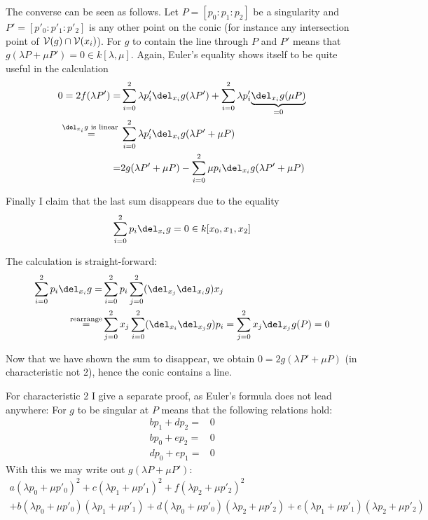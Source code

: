 The converse can be seen as follows. Let $P=[p_0:p_1:p_2]$ be a singularity and $P'=[p'_0:p'_1:p'_2]$ is any other point on the conic (for instance any intersection point of $\operatorname{\mathcal V}(g) \cap \operatorname{\mathcal V}(x_i)$).
For $g$ to contain the line through $P$ and $P'$ means that $g(\lambda P + \mu P') = 0 \in k[\lambda,\mu]$.
Again, Euler's equality shows itself to be quite useful in the calculation
\begin{align}
0
= 2f(\lambda P')
=& \sum_{i=0}^2 \lambda p'_i \del_{x_i}g(\lambda P') 
+ \sum_{i=0}^2 \lambda p'_i \underset{=0}{\underbrace{\del_{x_i}g(\mu P)}}
\\
\overset{\del_{x_i}g\text{ is linear }}=& \sum_{i=0}^2 \lambda p'_i \del_{x_i} g(\lambda P'+\mu P) 
\\
=& 2g(\lambda P' + \mu P) - \sum_{i=0}^2 \mu p_i \del_{x_i}g(\lambda P' + \mu P)
\end{align}

Finally I claim that the last sum disappears due to the equality
\begin{equation}
\sum_{i=0}^2 p_i \del_{x_i}g = 0 \in k[x_0,x_1,x_2]
\end{equation}

The calculation is straight-forward:
\begin{align}
\sum_{i=0}^2 p_i \del_{x_i} g
=& \sum_{i=0}^2 p_i \sum_{j=0}^2 (\del_{x_j}\del_{x_i}g)x_j
\\
\overset{\text{rearrange}}=& \sum_{j=0}^2 x_j \sum_{i=0}^2 (\del_{x_i}\del_{x_j}g)p_i = \sum_{j=0}^2 x_j \del_{x_j}g(P) = 0
\end{align}

Now that we have shown the sum to disappear, we obtain $0 = 2g(\lambda P' + \mu P)$ (in characteristic not 2), hence the conic contains a line.

For characteristic 2 I give a separate proof, as Euler's formula does not lead anywhere:
For $g$ to be singular at $P$ means that the following relations hold:
\begin{align}
bp_1 + dp_2 =& 0\\
bp_0 + ep_2 =& 0\\
dp_0 + ep_1 =& 0
\end{align}
With this we may write out $g(\lambda P + \mu P')$:
\begin{align}
a(\lambda p_0 + \mu p'_0)^2
+c(\lambda p_1 + \mu p'_1)^2
+f(\lambda p_2 + \mu p'_2)^2 \\
+b (\lambda p_0 + \mu p'_0)(\lambda p_1 + \mu p'_1)
+d (\lambda p_0 + \mu p'_0)(\lambda p_2 + \mu p'_2)
+e (\lambda p_1 + \mu p'_1)(\lambda p_2 + \mu p'_2)
\end{align}


